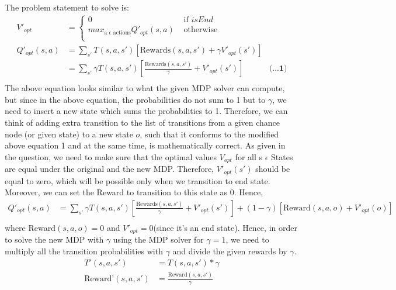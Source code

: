 \documentclass[12pt]{article}
\begin{document}
\begin{enumerate}[label=(\alph*)]
\begin{align*}
	\end{align*}
	The problem statement to solve is: \\
	\begin{align*}
	V'_{opt} &= \begin{cases}
	0 & \text{  if $isEnd$} \\
	max_{\text{a } \epsilon \text{ actions}} Q'_{opt}(s, a) & \text{  otherwise} \\
	\end{cases} \\
	Q'_{opt} (s, a) &= \sum_{s'} T(s, a, s')[\text{Rewards} (s,a,s') + \gamma V'_{opt}(s')] \\
	&=\sum_{s'} \gamma T(s, a, s') [\frac{\text{Rewards} (s,a,s')}{\gamma} + V'_{opt}(s')] & \textbf{(...1)} \\
	\end{align*}
	The above equation looks similar to what the given MDP solver can compute, but since in the above equation, the probabilities do not sum to 1 but to $\gamma$, we need to insert a new state which sums the probabilities to 1. Therefore, we can think of adding extra transition to the list of transitions from a given chance node (or given state) to a new state $o$, such that it conforms to the modified above equation 1 and at the same time, is mathematically correct. As given in the question, we need to make sure that the optimal values $V_{opt}$ for all s $\epsilon$ States are equal under the original and the new MDP. Therefore, $V'_{opt}(s')$ should be equal to zero, which will be possible only when we transition to end state. Moreover, we can set the Reward to transition to this state as 0. Hence,
	\begin{align*}
	Q'_{opt} (s, a) &= \sum_{s'} \gamma T(s, a, s') [\frac{\text{Rewards} (s,a,s')}{\gamma} + V'_{opt}(s')]  + (1-\gamma) [\text{Reward} (s, a, o) + V'_{opt}(o)] \\
	\end{align*}
	where Reward$(s,a,o) = 0$ and $V'_{opt} = 0$(since it's an end state).
	Hence, in order to solve the new MDP with $\gamma$ using the MDP solver for $\gamma = 1$, we need to multiply all the transition probabilities with $\gamma$ and divide the given rewards by $\gamma$. \\
	\begin{align*}
		T'(s,a,s') &= T(s,a,s') * \gamma \\
		\text{Reward'} (s,a,s') &= \frac{\text{Reward} (s,a,s')}{\gamma}
	\end{align*}	 
\end{enumerate}
\end{document}

